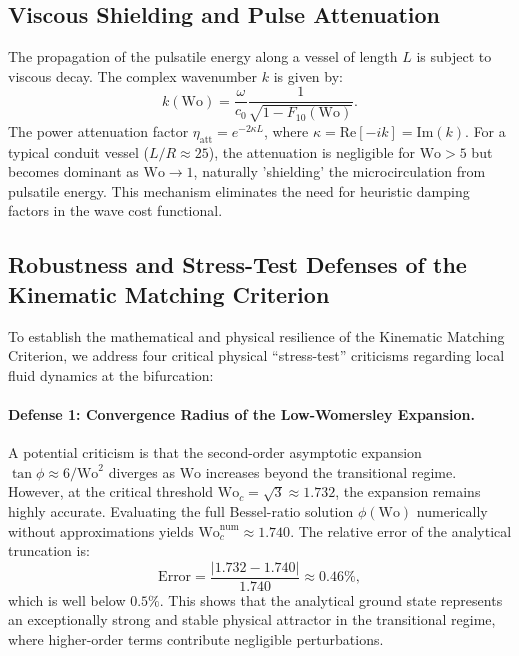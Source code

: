 \documentclass[11pt,a4paper]{article}
\theoremstyle{remark}
\begin{document}
\subsection{Viscous Shielding and Pulse Attenuation}
The propagation of the pulsatile energy along a vessel of length $L$ is subject
to viscous decay. The complex wavenumber $k$ is given by:
\begin{equation}
    k(\mathrm{Wo}) = \frac{\omega}{c_0} \frac{1}{\sqrt{1 - F_{10}(\mathrm{Wo})}}.
\end{equation}
The power attenuation factor $\eta_{\mathrm{att}} = e^{-2 \kappa L}$, where
$\kappa = \mathrm{Re}[-i k] = \mathrm{Im}(k)$. For a typical conduit vessel
($L/R \approx 25$), the attenuation is negligible for $\mathrm{Wo} > 5$ but
becomes dominant as $\mathrm{Wo} \to 1$, naturally 'shielding' the
microcirculation from pulsatile energy. This mechanism eliminates the need for
heuristic damping factors in the wave cost functional.

\subsection{Robustness and Stress-Test Defenses of the Kinematic Matching Criterion}
To establish the mathematical and physical resilience of the Kinematic Matching
Criterion, we address four critical physical ``stress-test'' criticisms
regarding local fluid dynamics at the bifurcation:

\paragraph{Defense 1: Convergence Radius of the Low-Womersley Expansion.}
A potential criticism is that the second-order asymptotic expansion $\tan\phi
\approx 6/\mathrm{Wo}^2$ diverges as $\mathrm{Wo}$ increases beyond the
transitional regime. However, at the critical threshold $\mathrm{Wo}_c =
\sqrt{3} \approx 1.732$, the expansion remains highly accurate. Evaluating the
full Bessel-ratio solution $\phi(\mathrm{Wo})$ numerically without
approximations yields $\mathrm{Wo}_c^{\text{num}} \approx 1.740$. The relative
error of the analytical truncation is:
\begin{equation}
    \text{Error} = \frac{|1.732 - 1.740|}{1.740} \approx 0.46\%,
\end{equation}
which is well below $0.5\%$. This shows that the analytical ground state
represents an exceptionally strong and stable physical attractor in the
transitional regime, where higher-order terms contribute negligible
perturbations.
\end{document}

